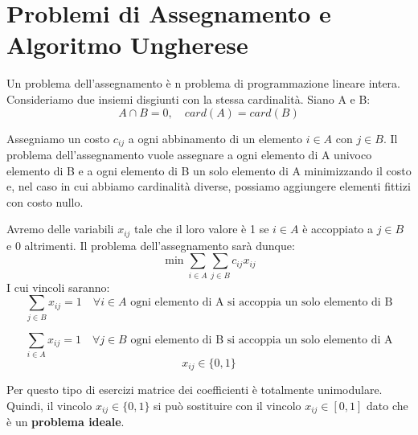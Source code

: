 \section{Problemi di Assegnamento e Algoritmo Ungherese}
Un problema dell'assegnamento è n problema di programmazione lineare intera. Consideriamo due insiemi disgiunti con la stessa cardinalità. Siano
A e B: 
\[A \cap B = 0, \quad card(A) = card(B)\]

Assegniamo un costo $c_{ij}$ a ogni abbinamento di un elemento $i \in A$ con $j \in B$. Il problema dell'assegnamento vuole assegnare a ogni elemento di A univoco elemento di B e a ogni elemento di B un solo elemento di A minimizzando il costo e, nel caso in cui abbiamo cardinalità diverse, possiamo aggiungere elementi fittizi con costo nullo.

Avremo delle variabili $x_{ij}$ tale che il loro valore è 1 se $i \in A$ è accoppiato a $j \in B$ e 0 altrimenti. Il problema dell'assegnamento sarà dunque:
\[\min \sum_{i \in A} \sum_{j \in B} c_{ij} x_{ij}\]
I cui vincoli saranno:
\[\sum_{j \in B} x _{ij} = 1 \quad \forall i \in A \text{ ogni elemento di A si accoppia un solo elemento di B}\]

\[\sum_{i \in A} x _{ij} = 1 \quad \forall j \in B \text{ ogni elemento di B si accoppia un solo elemento di A}\] 
\[x_{ij} \in \{0,1\}\]

Per questo tipo di esercizi  matrice dei coefficienti è totalmente unimodulare. Quindi, il vincolo $x_{ij} \in \{0,1\}$ si può sostituire con il vincolo
$x_{ij} \in [0,1]$ dato che è un \textbf{problema ideale}.
